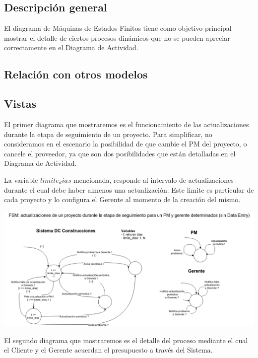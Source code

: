 \subsection{Descripción general}
El diagrama de Máquinas de Estados Finitos tiene como objetivo principal mostrar el detalle de ciertos procesos dinámicos que no se pueden apreciar correctamente en el Diagrama de Actividad.

\subsection{Relación con otros modelos}


\newpage
\subsection{Vistas}

El primer diagrama que mostraremos es el funcionamiento de las actualizaciones durante la etapa de seguimiento de un proyecto. Para simplificar, no consideramos en el escenario la posibilidad de que cambie el PM del proyecto, o cancele el proveedor, ya que son dos posibilidades que están detalladas en el Diagrama de Actividad.

La variable $limite_dias$ mencionada, responde al intervalo de actualizaciones durante el cual debe haber almenos una actualización. Este limite es particular de cada proyecto y lo configura el Gerente al momento de la creación del mismo.

\begin{center}
\includegraphics[scale=0.5, angle=90]{imagenes/FSM1.png}
\end{center}

\newpage
El segundo diagrama que mostraremos es el detalle del proceso mediante el cual el Cliente y el Gerente acuerdan el presupuesto a través del Sistema.

